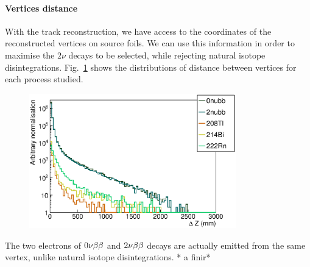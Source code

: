 \paragraph{Vertices distance}
With the track reconstruction, we have access to the coordinates of the reconstructed vertices on source foils.
We can use this information in order to maximise the $2\nu$ decays to be selected, while rejecting natural isotope disintegrations.
Fig.~\ref{fig:vertex_dist} shows the distributions of distance between vertices for each process studied.
\begin{figure}[h]
  \centering
  \includegraphics[width=0.8\textwidth]{Sensitivity/fig_sensitivity/Vertex_distance.eps}
  \caption{
    \label{fig:vertex_dist}}
\end{figure}
The two electrons of $0\nu\beta\beta$ and $2\nu\beta\beta$ decays are actually emitted from the same vertex, unlike natural isotope disintegrations.
* a finir*

